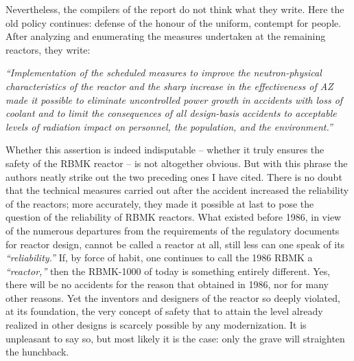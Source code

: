 \documentclass[openright]{bookest}
\begin{document}
Nevertheless, the compilers of the report do not think what they write. Here the old policy continues: defense of the honour of the uniform, contempt for people. After analyzing and enumerating the measures undertaken at the remaining reactors, they write:

\begin{personal}
\textit{``Implementation of the scheduled measures to improve the neutron-physical characteristics of the reactor and the sharp increase in the effectiveness of AZ made it possible to eliminate uncontrolled power growth in accidents with loss of coolant and to limit the consequences of all design-basis accidents to acceptable levels of radiation impact on personnel, the population, and the environment.''}
\end{personal}

Whether this assertion is indeed indisputable -- whether it truly ensures the safety of the RBMK reactor -- is not altogether obvious. But with this phrase the authors neatly strike out the two preceding ones I have cited. There is no doubt that the technical measures carried out after the accident increased the reliability of the reactors; more accurately, they made it possible at last to pose the question of the reliability of RBMK reactors. What existed before 1986, in view of the numerous departures from the requirements of the regulatory documents for reactor design, cannot be called a reactor at all, still less can one speak of its \textit{``reliability.''} If, by force of habit, one continues to call the 1986 RBMK a \textit{``reactor,''} then the RBMK-1000 of today is something entirely different. Yes, there will be no accidents for the reason that obtained in 1986, nor for many other reasons. Yet the inventors and designers of the reactor so deeply violated, at its foundation, the very concept of safety that to attain the level already realized in other designs is scarcely possible by any modernization. It is unpleasant to say so, but most likely it is the case: only the grave will straighten the hunchback.

\end{document}
